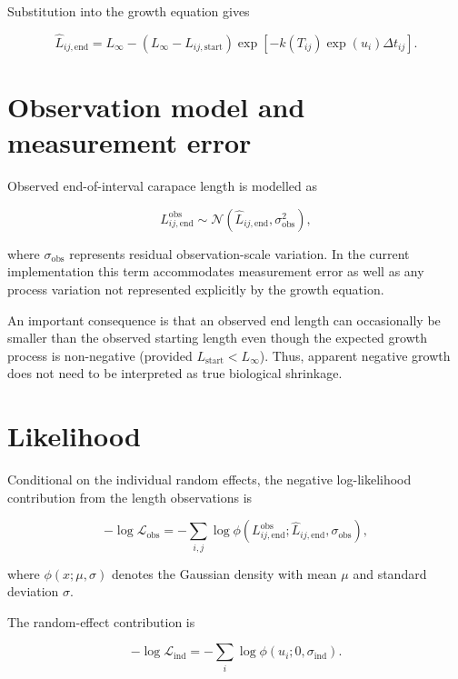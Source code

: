 \documentclass[11pt]{article}
\begin{document}
Substitution into the growth equation gives

\begin{equation}
\widehat{L}_{ij,\mathrm{end}}
=
L_{\infty}
-
\left(L_{\infty}-L_{ij,\mathrm{start}}\right)
\exp\left[-k(T_{ij})\exp(u_i)\Delta t_{ij}\right].
\end{equation}

\section{Observation model and measurement error}

Observed end-of-interval carapace length is modelled as

\begin{equation}
L_{ij,\mathrm{end}}^{\mathrm{obs}}
\sim
\mathcal{N}\left(
\widehat{L}_{ij,\mathrm{end}},
\sigma_{\mathrm{obs}}^2
\right),
\end{equation}

where $\sigma_{\mathrm{obs}}$ represents residual observation-scale variation. In the current implementation this term accommodates measurement error as well as any process variation not represented explicitly by the growth equation.

An important consequence is that an observed end length can occasionally be smaller than the observed starting length even though the expected growth process is non-negative (provided $L_{\mathrm{start}}<L_{\infty}$). Thus, apparent negative growth does not need to be interpreted as true biological shrinkage.

\section{Likelihood}

Conditional on the individual random effects, the negative log-likelihood contribution from the length observations is

\begin{equation}
-\log \mathcal{L}_{\mathrm{obs}}
=
-\sum_{i,j}
\log
\phi\left(
L_{ij,\mathrm{end}}^{\mathrm{obs}};
\widehat{L}_{ij,\mathrm{end}},
\sigma_{\mathrm{obs}}
\right),
\end{equation}

where $\phi(x;\mu,\sigma)$ denotes the Gaussian density with mean $\mu$ and standard deviation $\sigma$.

The random-effect contribution is

\begin{equation}
-\log \mathcal{L}_{\mathrm{ind}}
=
-\sum_i
\log
\phi\left(u_i;0,\sigma_{\mathrm{ind}}\right).
\end{equation}
\end{document}
